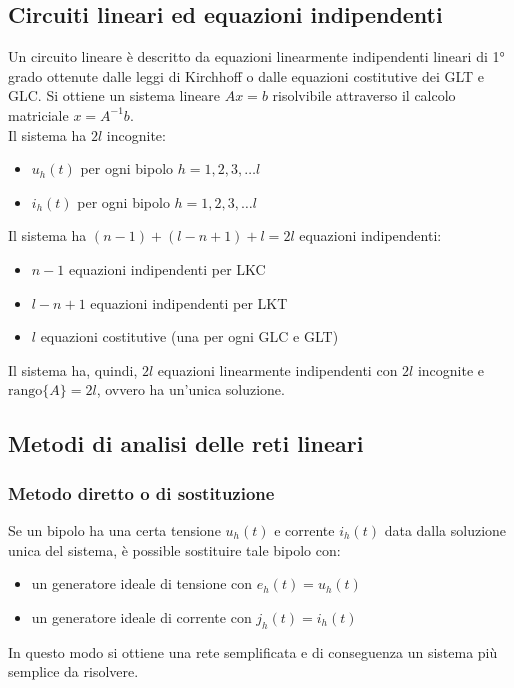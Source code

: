 \documentclass[a4paper]{article}
\begin{document}
\subsection{Circuiti lineari ed equazioni indipendenti}
Un circuito lineare è descritto da equazioni linearmente indipendenti lineari di 1° grado ottenute dalle leggi di Kirchhoff o
dalle equazioni costitutive dei GLT e GLC. Si ottiene un sistema lineare \(A x = b\) risolvibile attraverso il calcolo
matriciale \(x = A^{-1} b\). \\
Il sistema ha \(2l\) incognite:
\begin{itemize}
	\item \(u_h(t)\) per ogni bipolo \(h = 1,2,3, \dots l\)
	\item \(i_h(t)\) per ogni bipolo \(h = 1,2,3, \dots l\)
\end{itemize}
Il sistema ha \((n-1) + (l-n+1) + l = 2l\) equazioni indipendenti:
\begin{itemize}
	\item \(n-1\) equazioni indipendenti per LKC
	\item \(l-n+1\) equazioni indipendenti per LKT
	\item \(l\) equazioni costitutive (una per ogni GLC e GLT)
\end{itemize}
Il sistema ha, quindi, \(2l\) equazioni linearmente indipendenti con \(2l\) incognite e \(\text{rango}\{A\} = 2l\), ovvero ha
un'unica soluzione.

\subsection{Metodi di analisi delle reti lineari}
\subsubsection*{Metodo diretto o di sostituzione}
Se un bipolo ha una certa tensione \(u_h(t)\) e corrente \(i_h(t)\) data dalla soluzione unica del sistema, è possible sostituire
tale bipolo con:
\begin{itemize}
	\item un generatore ideale di tensione con \(e_h(t) = u_h(t)\)
	\item un generatore ideale di corrente con \(j_h(t) = i_h(t)\)
\end{itemize}
In questo modo si ottiene una rete semplificata e di conseguenza un sistema più semplice da risolvere.
\end{document}
